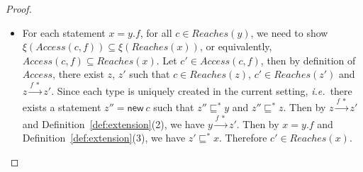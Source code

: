 \documentclass{fac}
\newcommand\ie{\textit{i.e.\ }}
\newcommand{\keyword}[1]{\mathsf{#1}}
\newcommand{\kwnew}[0]{\keyword{new}}
\newcommand{\less}{\sqsubseteq}
\newcommand{\hflow}{\longrightarrow}
\newcommand{\lhflow}[1]{\stackrel{#1}{\hflow}}
\begin{document}
\begin{proof}
\begin{itemize}
\item For each statement $x = y.f$, for all $c\in Reaches(y)$, we need to show $\xi(Access(c,f))\subseteq\xi(Reaches(x))$, or equivalently, $Access(c,f)\subseteq Reaches(x)$. Let $c'\in Access(c,f)$, then by definition of $Access$, there exist $z$, $z'$ such that $c\in Reaches(z)$, $c'\in Reaches(z')$ and $z\lhflow{f\ *}z'$.
    Since each type is uniquely created in the current setting, \ie there exists a statement $z''= \kwnew\ c$ such that $z''\less^* y$ and $z''\less^* z$. Then by $z\lhflow{f\ *}z'$ and Definition~\ref{def:extension}(2), we have $y\lhflow{f\ *}z'$. Then by $x = y.f$ and Definition~\ref{def:extension}(3), we have $z'\less^*x$. Therefore $c'\in Reaches(x)$.
\end{itemize}

\medskip


\end{proof}
\end{document}
